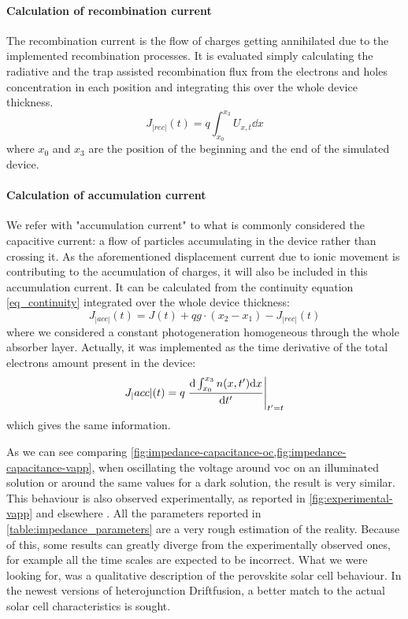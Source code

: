 	\paragraph{Calculation of recombination current}\label{impedance_recombination}
	The recombination current is the flow of charges getting annihilated due to the implemented recombination processes.
	It is evaluated simply calculating the radiative and the trap assisted recombination flux from the electrons and holes concentration in each position and integrating this over the whole device thickness.
	\begin{equation}
	J_|rec|(t) = q \int_{x_0}^{x_3} U_{x,t} \dd x
	\end{equation}
	where $x_0$ and $x_3$ are the position of the beginning and the end of the simulated device.
	
	\paragraph{Calculation of accumulation current}\label{impedance_accumulation}
	We refer with "accumulation current" to what is commonly considered the capacitive current: a flow of particles accumulating in the device rather than crossing it. 
	As the aforementioned displacement current due to ionic movement is contributing to the accumulation of charges, it will also be included in this accumulation current.
	It can be calculated from the continuity equation \cref{eq_continuity} integrated over the whole device thickness:
\begin{equation}
				J_|acc|(t) = J(t) + qg \cdot (x_2-x_1) - J_|rec|(t)
\end{equation}
	where we considered a constant photogeneration homogeneous through the whole absorber layer.
	Actually, it was implemented as the time derivative of the total electrons amount present in the device:
	\begin{equation}
	J_|acc|(t) = q\eval{\dv{\int_{x_0}^{x_3} n(x,t') \dd x}{t'}}_{t'=t}
	\end{equation}
	which gives the same information.



As we can see comparing \cref{fig:impedance-capacitance-oc,fig:impedance-capacitance-vapp}, when oscillating the voltage around \gls{voc} on an illuminated solution or around the same values for a dark solution, the result is very similar.
This behaviour is also observed experimentally, as reported in \cref{fig:experimental-vapp} and elsewhere \cite{Ebadi2019,Tress2015, }.
All the parameters reported in \cref{table:impedance_parameters} are a very rough estimation of the reality.
Because of this, some results can greatly diverge from the experimentally observed ones, for example all the time scales are expected to be incorrect.
What we were looking for, was a qualitative description of the perovskite solar cell behaviour.
In the newest versions of heterojunction Driftfusion, a better match to the actual solar cell characteristics is sought.

